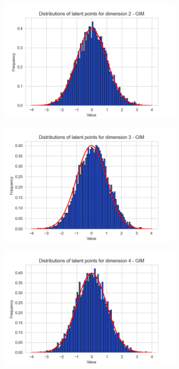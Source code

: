 \begin{figure}[h]
\begin{subfigure}[b]{0.25\textwidth}
	\end{subfigure}
	\hfill
	\begin{subfigure}[b]{0.25\textwidth}
		\centering
		\includegraphics[width=1\linewidth]{"graphs/distr/module1 kld0035/_ distribution_latent_space_GIM_dim=1"}
	\end{subfigure}
	\hfill
	\begin{subfigure}[b]{0.25\textwidth}
		\centering
		\includegraphics[width=1\linewidth]{"graphs/distr/module1 kld0035/_ distribution_latent_space_GIM_dim=2"}
	\end{subfigure}
	\hfill
	\begin{subfigure}[b]{0.25\textwidth}
		\centering
		\includegraphics[width=1\linewidth]{"graphs/distr/module1 kld0035/_ distribution_latent_space_GIM_dim=3"}

\end{subfigure}
\end{figure}
